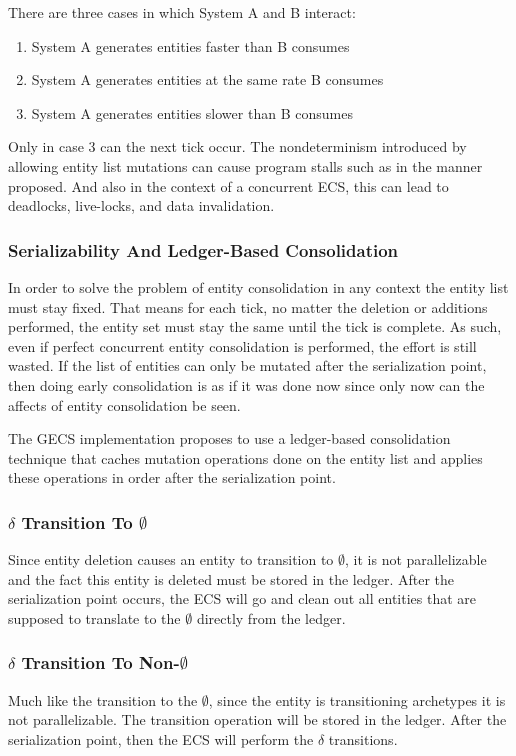 There are three cases in which System A and B interact:
\begin{enumerate}
    \item System A generates entities faster than B consumes
    \item System A generates entities at the same rate B consumes
    \item System A generates entities slower than B consumes
\end{enumerate}

Only in case 3 can the next tick occur. The nondeterminism introduced by allowing entity list mutations can cause program stalls such as in the manner proposed. And also in the context of a concurrent ECS, this can lead to deadlocks, live-locks, and data invalidation.

\subsubsection{Serializability And Ledger-Based Consolidation}
\label{sec:ledger}
In order to solve the problem of entity consolidation in any context the entity list must stay fixed. That means for each tick, no matter the deletion or additions performed, the entity set must stay the same until the tick is complete. As such, even if perfect concurrent entity consolidation is performed, the effort is still wasted. If the list of entities can only be mutated after the serialization point, then doing early consolidation is as if it was done now since only now can the affects of entity consolidation be seen. 

The GECS implementation proposes to use a ledger-based consolidation technique that caches mutation operations done on the entity list and applies these operations in order after the serialization point.

\subsubsection{$\delta$ Transition To $\emptyset$}
Since entity deletion causes an entity to transition to $\emptyset$, it is not parallelizable and the fact this entity is deleted must be stored in the ledger. After the serialization point occurs, the ECS will go and clean out all entities that are supposed to translate to the $\emptyset$ directly from the ledger. 

\subsubsection{$\delta$ Transition To Non-$\emptyset$}
Much like the transition to the $\emptyset$, since the entity is transitioning archetypes it is not parallelizable. The transition operation will be stored in the ledger. After the serialization point, then the ECS will perform the $\delta$ transitions. 

